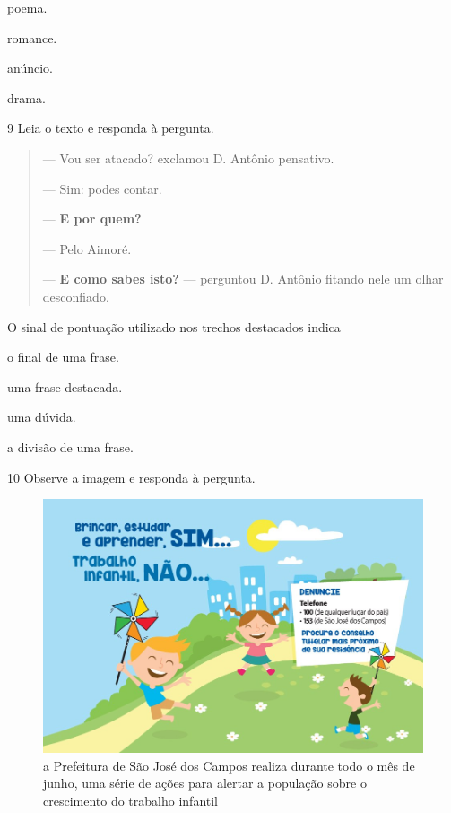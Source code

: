 \begin{escolha}
  \item poema.

  \item romance.

  \item anúncio.

  \item drama.
\end{escolha}


\num{9} Leia o texto e responda à pergunta.

\begin{quote}
--- Vou ser atacado? exclamou D. Antônio pensativo.

--- Sim: podes contar.

--- \textbf{E por quem?}

--- Pelo Aimoré.

--- \textbf{E como sabes isto?} --- perguntou D. Antônio fitando nele um olhar
desconfiado.
\end{quote}


O sinal de pontuação utilizado nos trechos destacados indica

\begin{escolha}
  \item o final de uma frase.

  \item uma frase destacada.

  \item uma dúvida.

  \item a divisão de uma frase.
\end{escolha} 



\num{10} Observe a imagem e responda à pergunta.

\begin{figure}
\includegraphics[width=\textwidth]{./imgQ4PORT/media/image1.jpeg}
\caption{a Prefeitura de São José dos Campos realiza durante todo o mês
de junho, uma série de ações para alertar a população sobre o
crescimento do trabalho infantil}
\end{figure}

